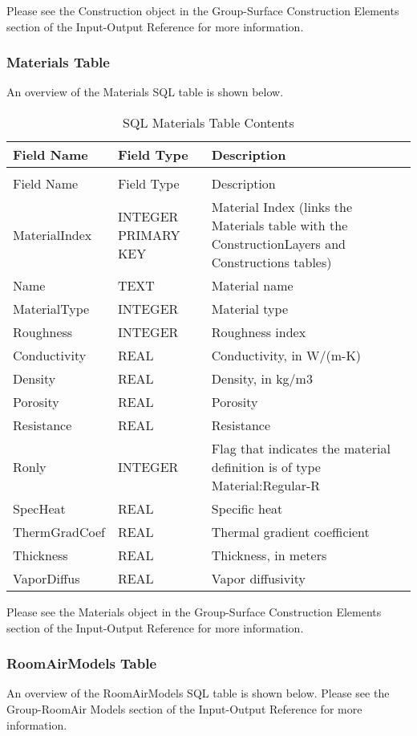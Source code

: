 Please see the Construction object in the Group-Surface Construction Elements section of the Input-Output Reference for more information.

\subsubsection{Materials Table}

An overview of the Materials SQL table is shown below.

\begin{longtable}[c]{p{1.5in}p{1.5in}p{3.0in}}
\caption{SQL Materials Table Contents \label{table:table-28.-sql-materials-table-contents}} \tabularnewline
\toprule 
Field Name & Field Type & Description \tabularnewline
\midrule
\endfirsthead

\caption[]{SQL Materials Table Contents} \tabularnewline
\toprule 
Field Name & Field Type & Description \tabularnewline
\midrule
\endhead

MaterialIndex & INTEGER PRIMARY KEY & Material Index (links the Materials table with the ConstructionLayers and Constructions tables) \tabularnewline
Name & TEXT & Material name \tabularnewline
MaterialType & INTEGER & Material type \tabularnewline
Roughness & INTEGER & Roughness index \tabularnewline
Conductivity & REAL & Conductivity, in W/(m-K) \tabularnewline
Density & REAL & Density, in kg/m3 \tabularnewline
Porosity & REAL & Porosity \tabularnewline
Resistance & REAL & Resistance \tabularnewline
Ronly & INTEGER & Flag that indicates the material definition is of type Material:Regular-R \tabularnewline
SpecHeat & REAL & Specific heat \tabularnewline
ThermGradCoef & REAL & Thermal gradient coefficient \tabularnewline
Thickness & REAL & Thickness, in meters \tabularnewline
VaporDiffus & REAL & Vapor diffusivity \tabularnewline
\bottomrule
\end{longtable}

Please see the Materials object in the Group-Surface Construction Elements section of the Input-Output Reference for more information.

\subsubsection{RoomAirModels Table}

An overview of the RoomAirModels SQL table is shown below. Please see the Group-RoomAir Models section of the Input-Output Reference for more information.

